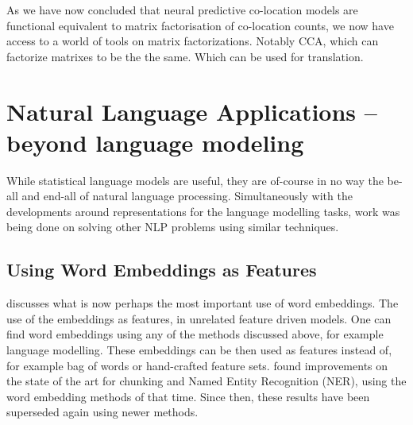 \documentclass[parskip]{komatufte}
\begin{document}
As we have now concluded that neural predictive co-location models are functional equivalent to matrix factorisation of co-location counts,
we now have access to a world of tools on matrix factorizations.
Notably CCA, which can factorize matrixes to be the the same.
Which can be used for translation.


\section{Natural Language Applications -- beyond language modeling}
While statistical language models are useful, they are of-course in no way the be-all and end-all of natural language processing.
Simultaneously with the developments around representations for the language modelling tasks, work was being done on solving other NLP problems using similar techniques.



\subsection{Using Word Embeddings as Features}


 discusses what is now perhaps the most important use of word embeddings.
The use of the embeddings as features, in unrelated feature driven models.
One can find word embeddings using any of the methods discussed above, for example language modelling.
These embeddings can be then used as features instead of, for example bag of words or hand-crafted feature sets.
 found improvements on the state of the art for chunking and Named Entity Recognition (NER), using the word embedding methods of that time.
Since then, these results have been superseded again using newer methods.









\clearnotecolumn[notes]
\end{document}
